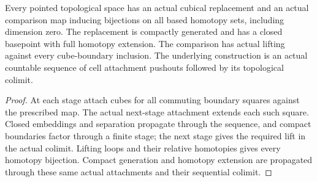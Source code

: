 \begin{proposition}
  \leanok
  Every pointed topological space has an actual cubical replacement and an actual comparison map inducing bijections on all based homotopy sets, including dimension zero. The replacement is compactly generated and has a closed basepoint with full homotopy extension. The comparison has actual lifting against every cube-boundary inclusion. The underlying construction is an actual countable sequence of cell attachment pushouts followed by its topological colimit.
\end{proposition}
\begin{proof}
  At each stage attach cubes for all commuting boundary squares against the prescribed map. The actual next-stage attachment extends each such square. Closed embeddings and separation propagate through the sequence, and compact boundaries factor through a finite stage; the next stage gives the required lift in the actual colimit. Lifting loops and their relative homotopies gives every homotopy bijection. Compact generation and homotopy extension are propagated through these same actual attachments and their sequential colimit.
  \leanok
\end{proof}


